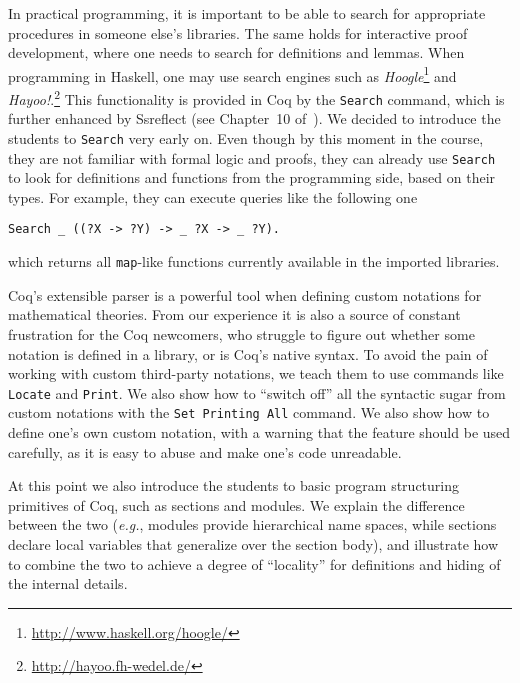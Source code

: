 \documentclass[blockstyle,preprint,nocopyrightspace]{sigplanconf}
\newcommand{\is}[1]{\textcolor{blue}{(Ilya: {#1})}}
\newcommand{\an}[1]{\textcolor{red}{(Aleks: {#1})}}
\newcommand{\code}[1]{\lstinline{#1}}
\newcommand{\eg}{\emph{e.g.}\xspace}
\begin{document}
In practical programming, it is important to be able to search for
appropriate procedures in someone else's libraries. The same holds for
interactive proof development, where one needs to search for
definitions and lemmas. When programming in Haskell, one may use
search engines such as
\emph{Hoogle}\footnote{\footnotesize{\url{http://www.haskell.org/hoogle/}}}
and
\emph{Hayoo!}.\footnote{\footnotesize{\url{http://hayoo.fh-wedel.de/}}}
This functionality is provided in Coq by the \code{Search} command,
which is further enhanced by Ssreflect (see Chapter~10
of~\cite{Gonthier-al:TR}). We decided to introduce the students to
\code{Search} very early on. Even though by this moment in the course,
they are not familiar with formal logic and proofs, they can already
use \code{Search} to look for definitions and functions from the
programming side, based on their types. For example, they can execute
queries like the following one
%
\begin{lstlisting}
Search _ ((?X -> ?Y) -> _ ?X -> _ ?Y).
\end{lstlisting}
%
which returns all \code{map}-like functions currently available in
the imported libraries.  

Coq's extensible parser is a powerful tool when defining custom
notations for mathematical theories. From our experience it is also a
source of constant frustration for the Coq newcomers, who struggle to
figure out whether some notation is defined in a library, or is Coq's
native syntax. To avoid the pain of working with custom third-party
notations, we teach them to use commands like \code{Locate} and
\code{Print}. We also show how to ``switch off'' all the syntactic
sugar from custom notations with the \code{Set Printing All}
command. We also show how to define one's own custom notation, with a
warning that the feature should be used carefully, as it is easy to
abuse and make one's code unreadable.

At this point we also introduce the students to basic program
structuring primitives of Coq, such as sections and modules. We
explain the difference between the two (\eg, modules provide
hierarchical name spaces, while sections declare local variables that
generalize over the section body), and illustrate how to combine the
two to achieve a degree of ``locality'' for definitions and hiding of
the internal details.
%
\end{document}
